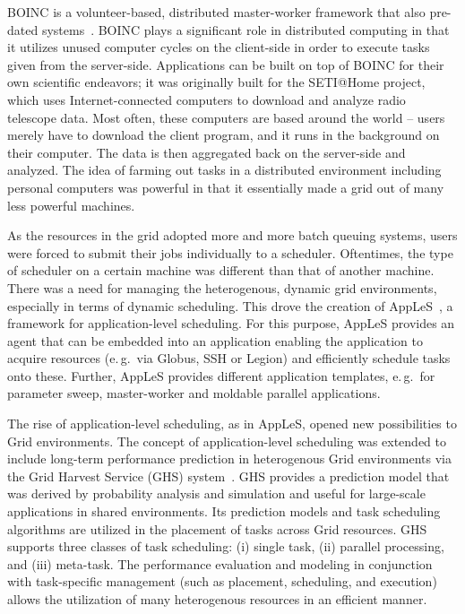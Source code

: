 \documentclass{sig-alternate}
\begin{document}

BOINC is a volunteer-based, distributed master-worker framework that
also pre-dated \pilotjob
systems~\cite{Anderson:2004:BSP:1032646.1033223}. BOINC plays a
significant role in distributed computing in that it utilizes unused
computer cycles on the client-side in order to execute tasks given
from the server-side. Applications can be built on top of BOINC for
their own scientific endeavors; it was originally built for the
SETI@Home project, which uses Internet-connected computers to download
and analyze radio telescope data. Most often, these computers are
based around the world -- users merely have to download the client
program, and it runs in the background on their computer. The data is
then aggregated back on the server-side and analyzed. The idea of
farming out tasks in a distributed environment including personal
computers was powerful in that it essentially made a grid out of many
less powerful machines.

As the resources in the grid adopted more and more batch queuing
systems, users were forced to submit their jobs individually to a
scheduler. Oftentimes, the type of scheduler on a certain machine was
different than that of another machine. There was a need for managing
the heterogenous, dynamic grid environments, especially in terms of
dynamic scheduling. This drove the creation of
AppLeS~\cite{Berman:2003:ACG:766629.766632}, a framework for
application-level scheduling. For this purpose, AppLeS provides an
agent that can be embedded into an application enabling the
application to acquire resources (e.\,g.\ via Globus, SSH or Legion)
and efficiently schedule tasks onto these. Further, AppLeS provides
different application templates, e.\,g.\ for parameter sweep,
master-worker and moldable parallel applications.

The rise of application-level scheduling, as in AppLeS, opened new
possibilities to Grid environments. The concept of application-level
scheduling was extended to include long-term performance prediction in
heterogenous Grid environments via the Grid Harvest Service (GHS)
system~\cite{ghs}. GHS provides a prediction model that was derived by
probability analysis and simulation and useful for large-scale
applications in shared environments. Its prediction models and task
scheduling algorithms are utilized in the placement of tasks across
Grid resources. GHS supports three classes of task scheduling: (i)
single task, (ii) parallel processing, and (iii) meta-task. The
performance evaluation and modeling in conjunction with task-specific
management (such as placement, scheduling, and execution) allows the
utilization of many heterogenous resources in an efficient manner.
\end{document}
